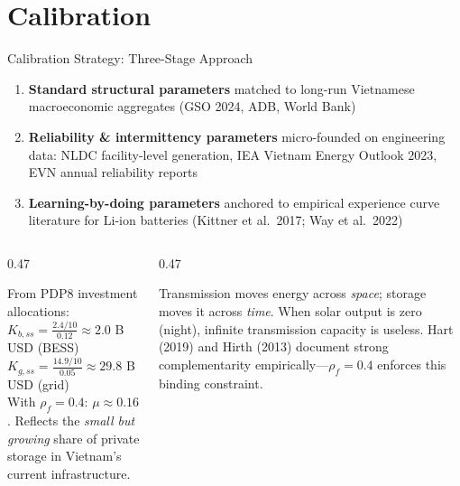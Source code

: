 \documentclass[aspectratio=169,10pt]{beamer}
\begin{document}
\section{Calibration}

\begin{frame}{Calibration Strategy: Three-Stage Approach}
	\begin{enumerate}
		\item \textbf{Standard structural parameters} matched to long-run Vietnamese macroeconomic aggregates (GSO 2024, ADB, World Bank)
		\item \textbf{Reliability \& intermittency parameters} micro-founded on engineering data: NLDC facility-level generation, IEA Vietnam Energy Outlook 2023, EVN annual reliability reports
		\item \textbf{Learning-by-doing parameters} anchored to empirical experience curve literature for Li-ion batteries (Kittner et al.\ 2017; Way et al.\ 2022)
	\end{enumerate}
	\vspace{0.5em}
	\begin{columns}[T]
		\begin{column}{0.47\textwidth}
			\begin{keybox}[title={Calibration Target: Flexibility Weight $\mu=0.16$}]
				\scriptsize
				From PDP8 investment allocations:\medskip\\
				$K_{b,ss} = \frac{2.4/10}{0.12}\approx 2.0$ B USD (BESS)\\[2pt]
				$K_{g,ss} = \frac{14.9/10}{0.05}\approx 29.8$ B USD (grid)\\[4pt]
				With $\rho_f=0.4$: $\mu\approx 0.16$. Reflects the \textit{small but growing} share of private storage in Vietnam's current infrastructure.
			\end{keybox}
		\end{column}
		\begin{column}{0.47\textwidth}
			\begin{keybox}[title={Complementarity: $\rho_f=0.40$}]
				\scriptsize Transmission moves energy across \textit{space}; storage moves it across \textit{time}. When solar output is zero (night), infinite transmission capacity is useless. Hart (2019) and Hirth (2013) document strong complementarity empirically---$\rho_f=0.4$ enforces this binding constraint.
			\end{keybox}
		\end{column}
	\end{columns}
\end{frame}
\end{document}
